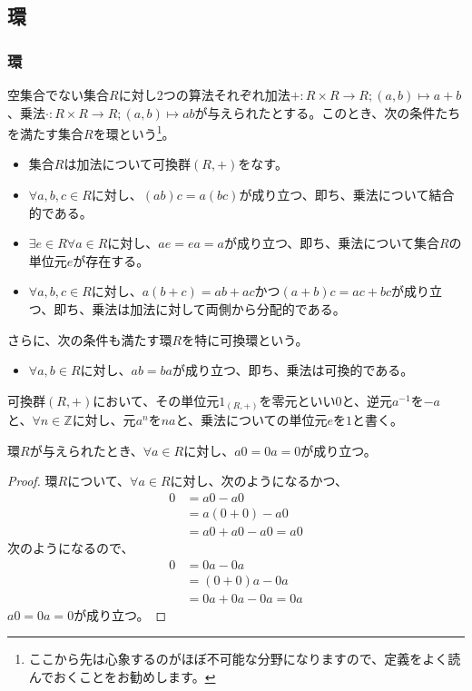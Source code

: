 \documentclass[dvipdfmx]{jsarticle}
\begin{document}
\subsection{環}%
\subsubsection{環}%
\begin{axs}[環の公理]
空集合でない集合$R$に対し2つの算法それぞれ加法$+ :R \times R \rightarrow R;(a,b) \mapsto a + b$、乗法$\cdot :R \times R \rightarrow R;(a,b) \mapsto ab$が与えられたとする。このとき、次の条件たちを満たす集合$R$を環という\footnote{ここから先は心象するのがほぼ不可能な分野になりますので、定義をよく読んでおくことをお勧めします。}。
\begin{itemize}
\item
  集合$R$は加法について可換群$(R, + )$をなす。
\item
  $\forall a,b,c \in R$に対し、$(ab)c = a(bc)$が成り立つ、即ち、乗法について結合的である。
\item
  $\exists e \in R\forall a \in R$に対し、$ae = ea = a$が成り立つ、即ち、乗法について集合$R$の単位元$e$が存在する。
\item
  $\forall a,b,c \in R$に対し、$a(b + c) = ab + ac$かつ$(a + b)c = ac + bc$が成り立つ、即ち、乗法は加法に対して両側から分配的である。
\end{itemize}
さらに、次の条件も満たす環$R$を特に可換環という。
\begin{itemize}
\item
  $\forall a,b \in R$に対し、$ab = ba$が成り立つ、即ち、乗法は可換的である。
\end{itemize}
\end{axs}
\begin{dfn}
可換群$(R, + )$において、その単位元$1_{(R, + )}$を零元といい$0$と、逆元$a^{- 1}$を$- a$と、$\forall n \in \mathbb{Z}$に対し、元$a^{n}$を$na$と、乗法についての単位元$e$を$1$と書く。
\end{dfn}
\begin{thm}\label{3.3.1.1}
環$R$が与えられたとき、$\forall a \in R$に対し、$a0 = 0a = 0$が成り立つ。
\end{thm}
\begin{proof} 環$R$について、$\forall a \in R$に対し、次のようになるかつ、
\begin{align*}
0 &= a0 - a0\\
&= a(0 + 0) - a0\\
&= a0 + a0 - a0 = a0
\end{align*}
次のようになるので、
\begin{align*}
0 &= 0a - 0a\\
&= (0 + 0)a - 0a\\
&= 0a + 0a - 0a = 0a
\end{align*}
$a0 = 0a = 0$が成り立つ。
\end{proof}
\end{document}
